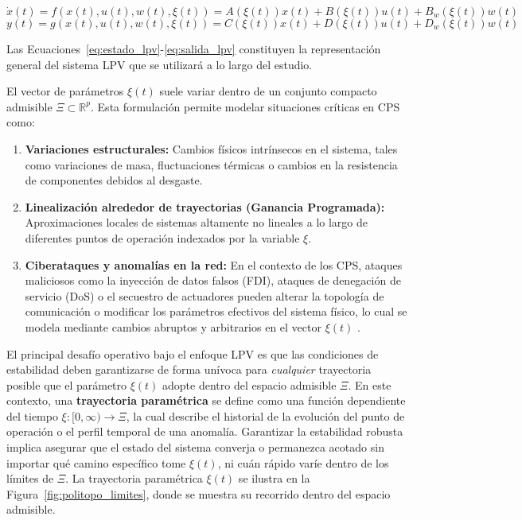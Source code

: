 \begin{equation}
    \dot{x}(t) = f(x(t), u(t), w(t), \xi(t)) = A(\xi(t)) x(t) + B(\xi(t)) u(t) + B_w(\xi(t)) w(t)
    \label{eq:estado_lpv}
\end{equation}
\begin{equation}
    y(t) = g(x(t), u(t), w(t), \xi(t)) = C(\xi(t)) x(t) + D(\xi(t)) u(t) + D_w(\xi(t)) w(t)
    \label{eq:salida_lpv}
\end{equation}

Las Ecuaciones~\eqref{eq:estado_lpv}-\eqref{eq:salida_lpv} constituyen la representación general del sistema LPV que se utilizará a lo largo del estudio.

El vector de parámetros $\xi(t)$ suele variar dentro de un conjunto compacto admisible $\Xi \subset \mathbb{R}^p$. Esta formulación permite modelar situaciones críticas en CPS como:
\begin{enumerate}
    \item \textbf{Variaciones estructurales:} Cambios físicos intrínsecos en el sistema, tales como variaciones de masa, fluctuaciones térmicas o cambios en la resistencia de componentes debidos al desgaste.
    \item \textbf{Linealización alrededor de trayectorias (Ganancia Programada):} Aproximaciones locales de sistemas altamente no lineales a lo largo de diferentes puntos de operación indexados por la variable $\xi$.
    \item \textbf{Ciberataques y anomalías en la red:} En el contexto de los CPS, ataques maliciosos como la inyección de datos falsos (FDI), ataques de denegación de servicio (DoS) o el secuestro de actuadores pueden alterar la topología de comunicación o modificar los parámetros efectivos del sistema físico, lo cual se modela mediante cambios abruptos y arbitrarios en el vector $\xi(t)$ \cite{pasqualetti2013attack, cardenas2008secure}.
\end{enumerate}

El principal desafío operativo bajo el enfoque LPV es que las condiciones de estabilidad deben garantizarse de forma unívoca para \textit{cualquier} trayectoria posible que el parámetro $\xi(t)$ adopte dentro del espacio admisible $\Xi$. En este contexto, una \textbf{trayectoria paramétrica} se define como una función dependiente del tiempo $\xi: [0, \infty) \to \Xi$, la cual describe el historial de la evolución del punto de operación o el perfil temporal de una anomalía. Garantizar la estabilidad robusta implica asegurar que el estado del sistema converja o permanezca acotado sin importar qué camino específico tome $\xi(t)$, ni cuán rápido varíe dentro de los límites de $\Xi$. La trayectoria paramétrica $\xi(t)$ se ilustra en la Figura~\ref{fig:politopo_limites}, donde se muestra su recorrido dentro del espacio admisible.


